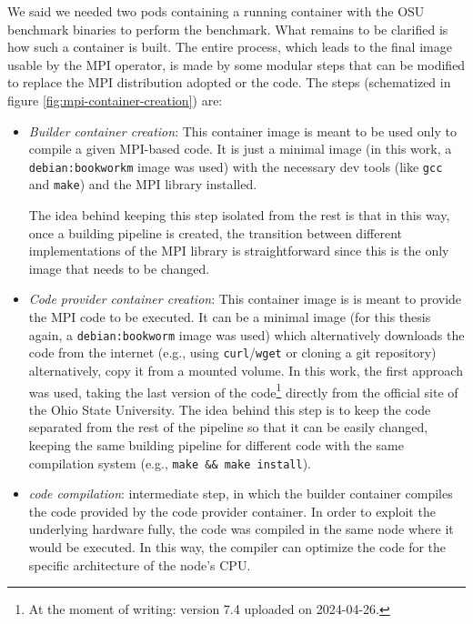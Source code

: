 We said we needed two pods containing a running container with the OSU benchmark
binaries to perform the benchmark. What remains to be clarified is how such a
container is built. The entire process, which leads to the final image usable by
the MPI operator, is made by some modular steps that can be modified to replace
the MPI distribution adopted or the code. The steps (schematized in figure
\ref{fig:mpi-container-creation}) are:
\begin{itemize}
  \itemsep0em
  \item \textit{Builder container creation}: This container image is meant to be used
    only to compile a given MPI-based code. It is just a minimal image (in this
    work, a \texttt{debian:bookworkm} image was used) with the necessary dev
    tools (like \texttt{gcc} and \texttt{make}) and the MPI library installed.

    The idea behind keeping this step isolated from the rest is that in this way,
    once a building pipeline is created, the transition between different
    implementations of the MPI library is straightforward since this is the only
    image that needs to be changed.

  \item \textit{Code provider container creation}: This container image is is meant to
    provide the MPI code to be executed. It can be a minimal image (for this
    thesis again, a \texttt{debian:bookworm} image was used) which
    alternatively downloads the code from the internet (e.g., using
    \texttt{curl}/\texttt{wget} or cloning a git repository) alternatively, copy
    it from a mounted volume. In this work, the first approach was used, taking
    the last version of the code\footnote{At the moment of writing: version 7.4
      uploaded on 2024-04-26.} directly from the official site of the Ohio State
    University.
    The idea behind this step is to keep the code separated from the rest of the
    pipeline so that it can be easily changed, keeping the same building pipeline
    for different code with the same compilation system (e.g., \texttt{make \&\&
      make install}).

  \item \textit{code compilation}: intermediate step, in which the builder
    container compiles the code provided by the code provider container. In
    order to exploit the underlying hardware fully, the code was compiled in the
    same node where it would be executed. In this way, the
    compiler can optimize the code for the specific architecture of the node's
    CPU.


\end{itemize}
